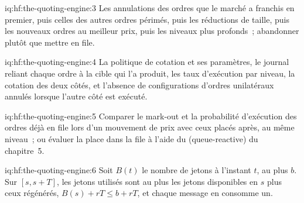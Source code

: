 \begin{solution}{iq:hf:the-quoting-engine:3}
Les annulations des ordres que le marché a franchis en premier, puis celles des autres ordres périmés, puis les réductions de taille, puis les nouveaux ordres au meilleur prix, puis
les niveaux plus profonds~; abandonner plutôt que mettre en file.
\end{solution}

\begin{solution}{iq:hf:the-quoting-engine:4}
La politique de cotation et ses paramètres, le journal reliant chaque ordre à la cible qui l'a produit, les taux d'exécution par niveau, la cotation des deux côtés, et
l'absence de configurations d'ordres unilatéraux annulés lorsque l'autre côté est exécuté.
\end{solution}

\begin{solution}{iq:hf:the-quoting-engine:5}
Comparer le mark-out et la probabilité d'exécution des ordres déjà en file lors d'un mouvement de prix avec ceux placés après, au même niveau~;
ou évaluer la place dans la file à l'aide du  (queue-reactive) du chapitre~5.
\end{solution}

\begin{solution}{iq:hf:the-quoting-engine:6}
Soit $B(t)$ le nombre de jetons à l'instant $t$, au plus $b$. Sur $[s,s+T]$, les jetons utilisés sont au plus les jetons disponibles en $s$ plus ceux régénérés,
$B(s)+rT\le b+rT$, et chaque message en consomme un.
\end{solution}

